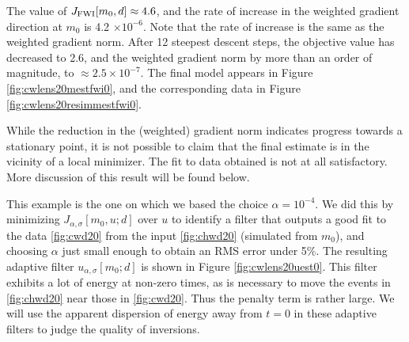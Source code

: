 The value of $J_{\rm FWI}[m_0,d] \approx 4.6$, and the rate of
increase in the weighted gradient direction at $m_0$ is 4.2 $\times
10^{-6 }$. Note that the rate of increase is the same as the weighted
gradient norm. After 12 steepest descent steps, the objective value has
decreased to 2.6, and the
weighted gradient norm by more than an order of magnitude, to $\approx 2.5 \times 10^{-7}$. The
final model appears in Figure \ref{fig:cwlens20mestfwi0}, and the
corresponding data in Figure \ref{fig:cwlens20resimmestfwi0}.




While the reduction in the (weighted) gradient norm indicates progress
towards a stationary point, it is not possible to claim that the final
estimate is in the vicinity of a local minimizer. The fit to data
obtained is not at all satisfactory. More discussion of this result
will be found below.

This example is the one on which we based the choice $\alpha =
10^{-4}$. We did this by minimizing $J_{\alpha,\sigma}[m_0, u; d]$
over $u$ to identify a filter that outputs a good fit to the data
\ref{fig:cwd20} from the input \ref{fig:chwd20} (simulated from
$m_0$), and choosing $\alpha$ just small enough to obtain an RMS error
under 5\%.  The resulting adaptive filter $u_{\alpha,\sigma}[m_0;d]$
is shown in Figure \ref{fig:cwlens20uest0}. This filter exhibits a lot
of energy at non-zero times, as is necessary to move the events in
\ref{fig:chwd20} near those in \ref{fig:cwd20}. Thus the penalty term
is rather large. We will use the apparent dispersion of energy away
from $t=0$ in these adaptive filters to judge the quality of
inversions.

